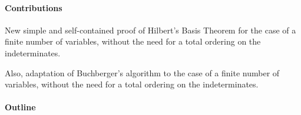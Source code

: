 \paragraph{Contributions}

New simple and self-contained proof of Hilbert's Basis Theorem
for the case of a finite number of variables, 
without the need for a total ordering on the indeterminates.

Also, adaptation of Buchberger's algorithm to the case of a
finite number of variables, without the need for a total ordering
on the indeterminates.

\paragraph{Outline}
